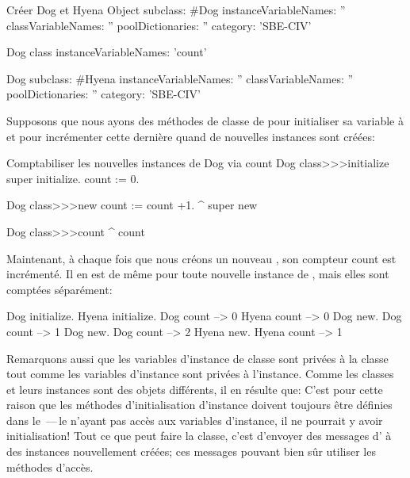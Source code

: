 \documentclass[a4paper,10pt,twoside]{book}
\begin{document}
\begin{classdef}[dog]{Cr\'eer Dog et Hyena}
Object subclass: #Dog
	instanceVariableNames: ''
	classVariableNames: ''
	poolDictionaries: ''
	category: 'SBE-CIV'

Dog class
	instanceVariableNames: 'count'

Dog subclass: #Hyena
	instanceVariableNames: ''
	classVariableNames: ''
	poolDictionaries: ''
	category: 'SBE-CIV'
\end{classdef}

Supposons que nous ayons des m\'ethodes de classe de  pour initialiser sa variable  \`a  et pour incr\'ementer cette derni\`ere quand de nouvelles instances sont cr\'e\'ees:
\begin{method}[dogcount]{Comptabiliser les nouvelles instances de Dog via count}
Dog class>>>initialize
	super initialize.
	count := 0.

Dog class>>>new
	count := count +1.
	^ super new

Dog class>>>count
	^ count
\end{method}

Maintenant, \`a chaque fois que nous cr\'eons un nouveau , son compteur
count est incr\'ement\'e. Il en est de m\^eme pour toute nouvelle instance de , mais elles sont compt\'ees s\'epar\'ement:
\begin{code}{}
Dog initialize.
Hyena initialize.
Dog count     --> 0
Hyena count --> 0
Dog new.
Dog count     --> 1
Dog new.
Dog count     --> 2
Hyena new.
Hyena count --> 1
\end{code}

Remarquons aussi que les variables d'instance de classe sont priv\'ees \`a la classe tout comme les variables d'instance sont priv\'ees \`a l'instance. 
Comme les classes et leurs instances sont des objets diff\'erents,
il en r\'esulte que:
C'est pour cette raison que les m\'ethodes d'initialisation d'instance doivent 
toujours \^etre d\'efinies dans le \,---\,le  n'ayant pas acc\`es aux variables d'instance, il ne pourrait y avoir initiali\-sation!  
Tout ce que peut faire la classe, c'est d'envoyer des messages d' \`a des instances nouvellement cr\'e\'ees; ces messages pouvant bien s\^ur utiliser les m\'ethodes d'acc\`es.
\end{document}
